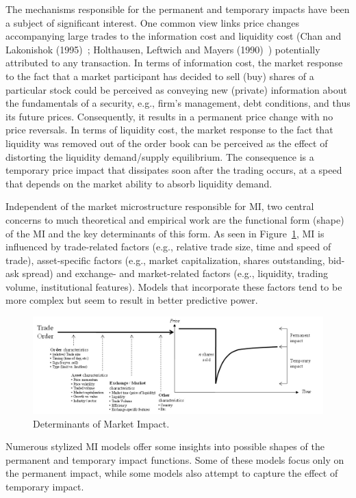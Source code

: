 The mechanisms responsible for the permanent and temporary impacts have been a subject of significant interest. One common view links price changes accompanying large trades to the information cost and liquidity cost (Chan and Lakonishok (1995)~\cite{chan1995}; Holthausen, Leftwich and Mayers (1990)~\cite{holthausen1990}) potentially attributed to any transaction. In terms of information cost, the market response to the fact that a market participant has decided to sell (buy) shares of a particular stock could be perceived as conveying new (private) information about the fundamentals of a security, e.g., firm's management, debt conditions, and thus its future prices. Consequently, it results in a permanent price change with no price reversals. In terms of liquidity cost, the market response to the fact that liquidity was removed out of the order book can be perceived as the effect of distorting the liquidity demand/supply equilibrium. The consequence is a temporary price impact that dissipates soon after the trading occurs, at a speed that depends on the market ability to absorb liquidity demand.


Independent of the market microstructure responsible for MI, two central concerns to much theoretical and empirical work are the functional form (shape) of the MI and the key determinants of this form. As seen in Figure~\ref{fig:detmarketimpt}, MI is influenced by trade-related factors (e.g., relative trade size, time and speed of trade), asset-specific factors (e.g., market capitalization, shares outstanding, bid-ask spread) and exchange- and market-related factors (e.g., liquidity, trading volume, institutional features). Models that incorporate these factors tend to be more complex but seem to result in better predictive power.
	\begin{figure}[!ht]
	\centering
	\includegraphics[width=\textwidth]{chapters/chapter_exec_models/figures/fig2.jpg}
	\caption{Determinants of Market Impact. \label{fig:detmarketimpt}}
	\end{figure}
Numerous stylized MI models offer some insights into possible shapes of the permanent and temporary impact functions. Some of these models focus only on the permanent impact, while some models also attempt to capture the effect of temporary impact. \\


